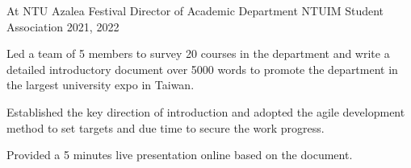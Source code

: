 

\begin{cventries}

%


  \cventry
    {At NTU Azalea Festival} %
    {Director of Academic Department} %
    {NTUIM Student Association} %
    {2021, 2022} %
    {
      \begin{cvitems} %
        \item {Led a team of 5 members to survey 20 courses in the department
            and write a detailed introductory document over 5000 words
            to promote the department in the largest university expo in Taiwan.}
        \item Established the key direction of introduction and adopted the agile
            development method to set targets and due time to secure the work progress.
        \item Provided a 5 minutes live presentation online based on the document.
      \end{cvitems}
    }


\end{cventries}
